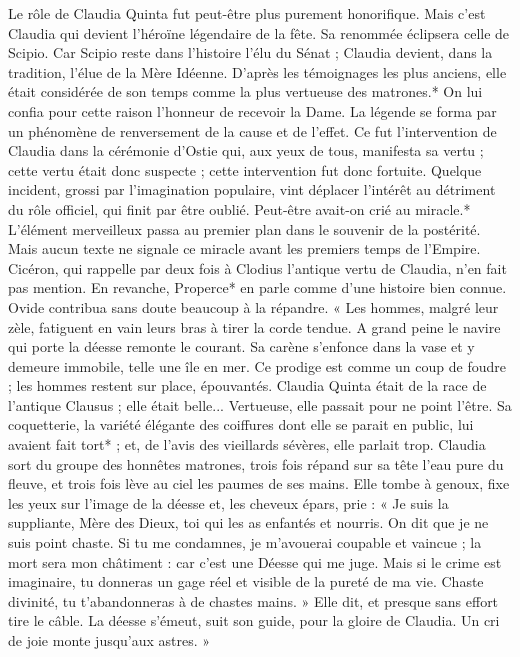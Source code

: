 \documentclass[a4paper, 11pt, oneside, polutonikogreek, french]{article}
\begin{document}
Le rôle de Claudia Quinta fut peut-être plus purement honorifique. Mais c'est Claudia qui devient l'héroïne légendaire de la fête. Sa renommée éclipsera celle de Scipio. Car Scipio reste dans l'histoire l'élu du Sénat ; Claudia devient, dans la tradition, l'élue de la Mère Idéenne. D'après les témoignages les plus anciens, elle était considérée de son temps comme la plus vertueuse des matrones.* On lui confia pour cette raison l'honneur de recevoir la Dame. La légende se forma par un phénomène de renversement de la cause et de l'effet. Ce fut l'intervention de Claudia dans la cérémonie d'Ostie qui, aux yeux de tous, manifesta sa vertu ; cette vertu était donc suspecte ; cette intervention fut donc fortuite. Quelque incident, grossi par l'imagination populaire, vint déplacer l'intérêt au détriment du rôle officiel, qui finit par être oublié. Peut-être avait-on crié au miracle.* L'élément merveilleux passa au premier plan dans le souvenir de la postérité. Mais aucun texte ne signale ce miracle avant les premiers temps de l'Empire. Cicéron, qui rappelle par deux fois à Clodius l'antique vertu de Claudia, n'en fait pas mention. En revanche, Properce* en parle comme d'une histoire bien connue. Ovide contribua sans doute beaucoup à la répandre. « Les hommes, malgré leur zèle, fatiguent en vain leurs bras à tirer la corde tendue. A grand peine le navire qui porte la déesse remonte le courant. Sa carène s'enfonce dans la vase et y demeure immobile, telle une île en mer. Ce prodige est comme un coup de foudre ; les hommes restent sur place, épouvantés. Claudia Quinta était de la race de l'antique Clausus ; elle était belle... Vertueuse, elle passait pour ne point l'être. Sa coquetterie, la variété élégante des coiffures dont elle se parait en public, lui avaient fait tort* ; et, de l'avis des vieillards sévères, elle parlait trop. Claudia sort du groupe des honnêtes matrones, trois fois répand sur sa tête l'eau pure du fleuve, et trois fois lève au ciel les paumes de ses mains. Elle tombe à genoux, fixe les yeux sur l'image de la déesse et, les cheveux épars, prie : « Je suis la suppliante, Mère des Dieux, toi qui les as enfantés et nourris. On dit que je ne suis point chaste. Si tu me condamnes, je m'avouerai coupable et vaincue ; la mort sera mon châtiment : car c'est une Déesse qui me juge. Mais si le crime est imaginaire, tu donneras un gage réel et visible de la pureté de ma vie. Chaste divinité, tu t'abandonneras à de chastes mains. » Elle dit, et presque sans effort tire le câble. La déesse s'émeut, suit son guide, pour la gloire de Claudia. Un cri de joie monte jusqu'aux astres. »
\end{document}
